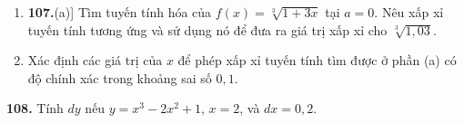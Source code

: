 \begin{minipage}[t]{0.485\textwidth}
\medskip
\begin{enumerate}[label=(\alph*), leftmargin=2.4em, labelsep=0.4em, itemsep=1.5pt, topsep=0pt]
    \item[\makebox[2.4em][l]{\textbf{107.}\hfill(a)}] Tìm tuyến tính hóa của $f(x) = \sqrt[3]{1 + 3x}$ tại $a = 0$. Nêu xấp xỉ tuyến tính tương ứng và sử dụng nó để đưa ra giá trị xấp xỉ cho $\sqrt[3]{1{,}03}$.
    \item[{\makebox[0pt][r]{\graphingicon\hspace{3pt}}(b)}] Xác định các giá trị của $x$ để phép xấp xỉ tuyến tính tìm được ở phần (a) có độ chính xác trong khoảng sai số $0{,}1$.
\end{enumerate}

\medskip
\textbf{108.} Tính $dy$ nếu $y = x^3 - 2x^2 + 1$, $x = 2$, và $dx = 0{,}2$.
\end{minipage}
